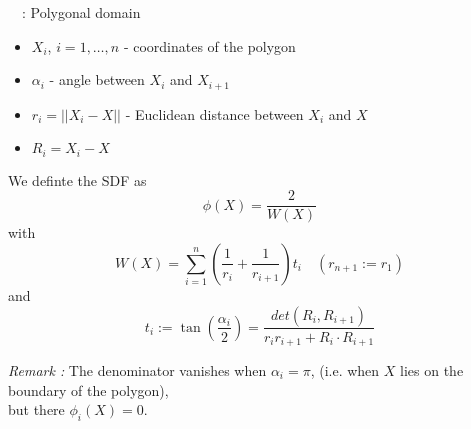 \begin{frame}{\appendixname~\theappendixframenumber~: Polygonal domain \cite{sukumar_exact_2022}}
	\begin{minipage}{0.68\linewidth}
		\begin{itemize}[]
			\item $X_i$, $i=1,\dots,n$ - coordinates of the polygon
			\item $\alpha_i$ - angle between $X_i$ and $X_{i+1}$
			\item $r_i=||X_i-X||$ - Euclidean distance between $X_i$ and $X$ \\
			\item $R_i=X_i-X$
		\end{itemize}
	\end{minipage}
	\begin{minipage}{0.28\linewidth}
		\centering
	\end{minipage}
	\vspace{-10pt}
	We definte the SDF as 
	\begin{equation*}
		\phi(X)=\frac{2}{W(X)}
	\end{equation*}
	with
	\begin{equation*}
		W(X)=\sum_{i=1}^{n}\left(\frac{1}{r_i}+\frac{1}{r_{i+1}}\right)t_i \quad (r_{n+1}:=r_1)
	\end{equation*}
	and 
	\begin{equation*}
		t_i:=\tan\left(\frac{\alpha_i}{2}\right)=\frac{det(R_i,R_{i+1})}{r_ir_{i+1}+R_i\cdot R_{i+1}}
	\end{equation*}

	\footnotesize
	\textit{Remark :} The denominator vanishes when $\alpha_i=\pi$, (i.e. when $X$ lies on the boundary of the polygon), \\ but there $\phi_i(X)=0$.
\end{frame}
\addtocounter{appendixframenumber}{1}

